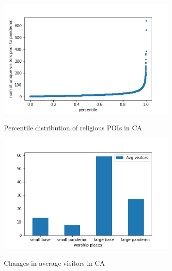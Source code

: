 \documentclass[12pt,english]{article}
\begin{document}
\begin{figure}[h]
	\centering
	\caption{\small Percentile distribution of religious POIs in CA}
	\includegraphics[width=0.8\textwidth, center]{./figures/1.percentile.png}
	\captionsetup{width=1.0\textwidth}
	\label{figure1}
\end{figure}

\begin{figure}[h]
	\centering
	\caption{\small Changes in average visitors in CA}
	\includegraphics[width=0.8\textwidth, center]{./figures/avg_visit.png}
	\captionsetup{width=1.0\textwidth}
	\label{figure2}
\end{figure}
\end{document}
